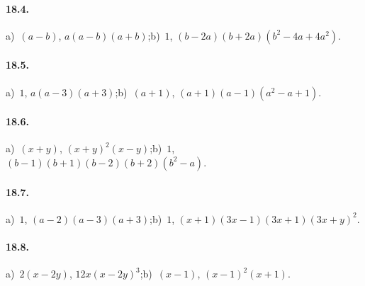 \paragraph{18.4.}
a)~$(a-b)$, $a(a-b)(a+b)$;\quad b)~$1$, $(b-2a)(b+2a)\left(b^2-4a+4a^2\right)$.

\paragraph{18.5.}
a)~$1$, $a(a-3)(a+3)$;\quad b)~$(a+1)$, $(a+1)(a-1)\left(a^2-a+1\right)$.

\paragraph{18.6.}
a)~$(x+y)$, $(x+y)^2(x-y)$;\quad b)~$1$, $(b-1)(b+1)(b-2)(b+2)\left(b^2-a\right)$.

\paragraph{18.7.}
a)~$1$, $(a-2)(a-3)(a+3)$;\quad b)~$1$, $(x+1)(3x-1)(3x+1)(3x+y)^2$.

\paragraph{18.8.}
a)~$2(x-2y)$, $12x(x-2y)^3$;\quad b)~$(x-1)$, $(x-1)^2(x+1)$.
